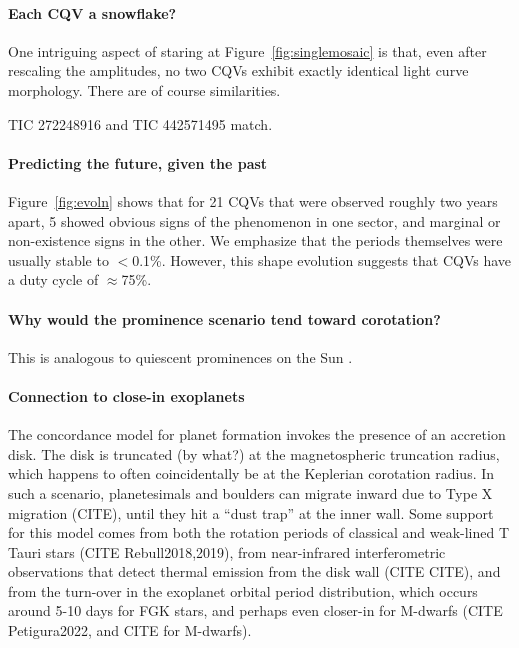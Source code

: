 \documentclass[11pt,twocolumn,tighten]{aastex63}
\begin{document}
\paragraph{Each CQV a snowflake?}
One intriguing aspect of staring at Figure~\ref{fig:singlemosaic}
is that, even after rescaling the amplitudes, no two CQVs
exhibit exactly identical light curve morphology.
There are of course similarities.

TIC 272248916 and TIC 442571495 match.


\paragraph{Predicting the future, given the past}
Figure~\ref{fig:evoln}
shows that for 21 CQVs that were observed roughly two years
apart, 5 showed obvious signs of the phenomenon in one sector,
and marginal or non-existence signs in the other.
We emphasize that the periods themselves were usually stable to $<$0.1\%.
However, this shape evolution
suggests that CQVs have a duty cycle of $\approx$75\%.



\paragraph{Why would the prominence scenario tend toward corotation?}
This is analogous to quiescent
prominences on the Sun \citep{1967SoPh....2...39K}.

\paragraph{Connection to close-in exoplanets}
The concordance model for planet formation invokes the presence of an accretion
disk.
The disk is truncated (by what?) at the magnetospheric truncation radius,
which happens to often coincidentally be at the Keplerian corotation radius.
In such a scenario, planetesimals and boulders can migrate inward due to
Type X migration (CITE),
until they hit a ``dust trap'' at the inner wall.
Some support for this model comes from both the rotation periods of classical
and weak-lined T Tauri stars
(CITE Rebull2018,2019),
from near-infrared interferometric observations that detect thermal
emission from the disk wall (CITE CITE),
and from the turn-over in the exoplanet orbital period distribution,
which occurs around 5-10 days for FGK stars, 
and perhaps even closer-in for M-dwarfs (CITE Petigura2022, and CITE for M-dwarfs).
\end{document}
